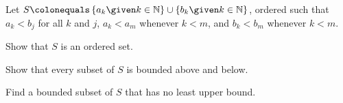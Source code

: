 \begin{problem}
  Let $S \colonequals \set{ a_k \given k \in \N} \cup \set{b_k \given k \in \N}$,
  ordered such that $a_k < b_j$ for all $k$ and $j$,
  $a_k < a_m$ whenever $k < m$, and $b_k < b_m$ whenever $k < m$.
  \begin{enumalph}
    \item Show that $S$ is an ordered set.
    \item Show that every subset of $S$ is bounded above and below.
    \item Find a bounded subset of $S$ that has no least upper bound.
  \end{enumalph}
\end{problem}
